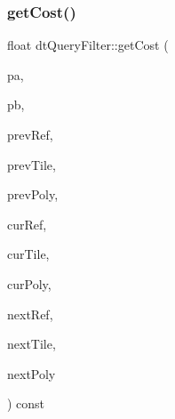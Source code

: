 \subsubsection{\texorpdfstring{get\+Cost()}{getCost()}\hspace{0.1cm}{\footnotesize\ttfamily [2/2]}}
{\footnotesize\ttfamily float dt\+Query\+Filter\+::get\+Cost (\begin{DoxyParamCaption}\item[{const float $\ast$}]{pa,  }\item[{const float $\ast$}]{pb,  }\item[{const \hyperlink{group__detour_gab4e0b2257a670c1a800057999612b466}{dt\+Poly\+Ref}}]{prev\+Ref,  }\item[{const \hyperlink{structdtMeshTile}{dt\+Mesh\+Tile} $\ast$}]{prev\+Tile,  }\item[{const \hyperlink{structdtPoly}{dt\+Poly} $\ast$}]{prev\+Poly,  }\item[{const \hyperlink{group__detour_gab4e0b2257a670c1a800057999612b466}{dt\+Poly\+Ref}}]{cur\+Ref,  }\item[{const \hyperlink{structdtMeshTile}{dt\+Mesh\+Tile} $\ast$}]{cur\+Tile,  }\item[{const \hyperlink{structdtPoly}{dt\+Poly} $\ast$}]{cur\+Poly,  }\item[{const \hyperlink{group__detour_gab4e0b2257a670c1a800057999612b466}{dt\+Poly\+Ref}}]{next\+Ref,  }\item[{const \hyperlink{structdtMeshTile}{dt\+Mesh\+Tile} $\ast$}]{next\+Tile,  }\item[{const \hyperlink{structdtPoly}{dt\+Poly} $\ast$}]{next\+Poly }\end{DoxyParamCaption}) const\hspace{0.3cm}{\ttfamily [inline]}}

